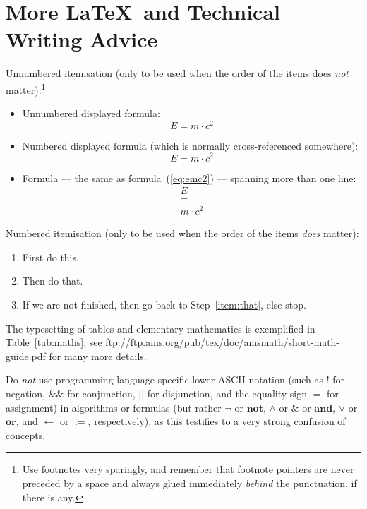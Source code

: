 \documentclass[a4paper,11pt]{article}
\begin{document}
\section{More \LaTeX\ and Technical Writing Advice}

Unnumbered itemisation (only to be used when the order of the items
does \emph{not} matter):\footnote{Use footnotes very sparingly, and
  remember that footnote pointers are never preceded by a space and
  always glued immediately \emph{behind} the punctuation, if there is
  any.}
\begin{itemize}
\item Unnumbered displayed formula:
  \[
  E = m \cdot c^2
  \]
\item Numbered displayed formula (which is normally cross-referenced
  somewhere):
  \begin{equation}
    \label{eq:emc2}
    E = m \cdot c^2
  \end{equation}
\item Formula --- the same as formula~(\ref{eq:emc2}) --- spanning
  more than one line:
  \begin{gather*}
    E \\ = \\ m \cdot c^2
  \end{gather*}  
\end{itemize}
Numbered itemisation (only to be used when the order of the items
\emph{does} matter):
\begin{enumerate}
\item First do this.
\item\label{item:that} Then do that.
\item If we are not finished, then go back to Step~\ref{item:that},
  else stop.
\end{enumerate}

The typesetting of tables and elementary mathematics is exemplified in
Table~\ref{tab:maths}; see
\url{ftp://ftp.ams.org/pub/tex/doc/amsmath/short-math-guide.pdf} for
many more details.

Do \emph{not} use programming-language-specific lower-ASCII notation
(such as $!$ for negation, $\&\&$ for conjunction, $||$ for
disjunction, and the equality sign $=$ for assignment) in algorithms
or formulas (but rather $\neg$ or $\mathbf{not}$, $\land$ or $\&$ or
$\mathbf{and}$, $\lor$ or $\mathbf{or}$, and $\gets$ or $:=$,
respectively), as this testifies to a very strong confusion of
concepts.
\end{document}
